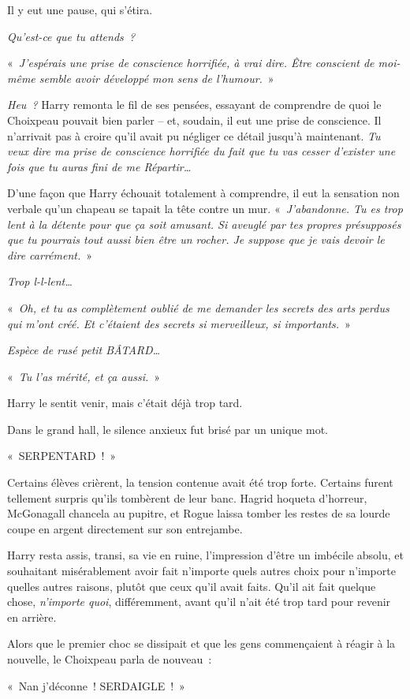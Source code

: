 Il y eut une pause, qui s'étira.

\emph{Qu'est-ce que tu attends~?}

«~\emph{J'espérais une prise de conscience horrifiée, à vrai dire.
Être conscient de moi-même semble avoir développé mon sens de l'humour.}~»

\emph{Heu~?} Harry remonta le fil de ses pensées, essayant de comprendre de quoi le Choixpeau pouvait bien parler -- et, soudain, il eut une prise de conscience.
Il n'arrivait pas à croire qu'il avait pu négliger ce détail jusqu'à maintenant.
\emph{Tu veux dire ma prise de conscience horrifiée du fait que tu vas cesser d'exister une fois que tu auras fini de me Répartir…}

D'une façon que Harry échouait totalement à comprendre, il eut la sensation non verbale qu'un chapeau se tapait la tête contre un mur.
«~\emph{J'abandonne.
Tu es trop lent à la détente pour que ça soit amusant.
Si aveuglé par tes propres présupposés que tu pourrais tout aussi bien être un rocher.
Je suppose que je vais devoir le dire carrément.}~»

\emph{Trop l-l-lent…}

«~\emph{Oh, et tu as complètement oublié de me demander les secrets des arts perdus qui m'ont créé.
Et c'étaient des secrets si merveilleux, si importants.}~»

\emph{Espèce de rusé petit BÂTARD…}

«~\emph{Tu l'as mérité, et ça aussi.}~»

Harry le sentit venir, mais c'était déjà trop tard.

Dans le grand hall, le silence anxieux fut brisé par un unique mot.

«~SERPENTARD~!~»

Certains élèves crièrent, la tension contenue avait été trop forte.
Certains furent tellement surpris qu'ils tombèrent de leur banc.
Hagrid hoqueta d'horreur, McGonagall chancela au pupitre, et Rogue laissa tomber les restes de sa lourde coupe en argent directement sur son entrejambe.

Harry resta assis, transi, sa vie en ruine, l'impression d'être un imbécile absolu, et souhaitant misérablement avoir fait n'importe quels autres choix pour n'importe quelles autres raisons, plutôt que ceux qu'il avait faits.
Qu'il ait fait quelque chose, \emph{n'importe quoi}, différemment, avant qu'il n'ait été trop tard pour revenir en arrière.

Alors que le premier choc se dissipait et que les gens commençaient à réagir à la nouvelle, le Choixpeau parla de nouveau~:

«~Nan j'déconne~! SERDAIGLE~!~»
